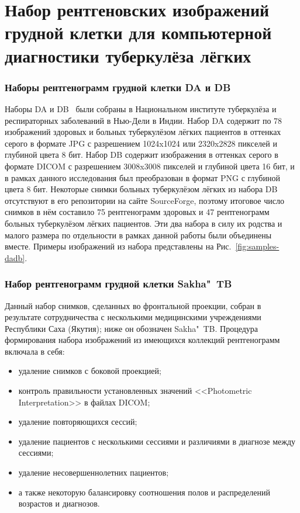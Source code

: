 \section{Набор рентгеновских изображений грудной клетки для компьютерной диагностики туберкулёза лёгких} \label{sec:sakha-tb}

\subsubsection{Наборы рентгенограмм грудной клетки DA и DB}

Наборы DA и DB~\cite{chauhan2014role} были собраны в Национальном институте туберкулёза и респираторных заболеваний в Нью-Дели в Индии. Набор DA содержит по 78 изображений здоровых и больных туберкулёзом лёгких пациентов в оттенках серого в формате JPG с разрешением 1024x1024 или 2320x2828 пикселей и глубиной цвета 8 бит. Набор DB содержит изображения в оттенках серого в формате DICOM с разрешением 3008x3008 пикселей и глубиной цвета 16 бит, и в рамках данного исследования был преобразован в формат PNG с глубиной цвета 8 бит. Некоторые снимки больных туберкулёзом лёгких из набора DB отсутствуют в его репозитории на сайте SourceForge, поэтому итоговое число снимков в нём составило 75 рентгенограмм здоровых и 47 рентгенограмм больных туберкулёзом лёгких пациентов. Эти два набора в силу их родства и малого размера по отдельности в рамках данной работы были объединены вместе. Примеры изображений из набора представлены на Рис.~\ref{fig:samples-dadb}.


\subsubsection{Набор рентгенограмм грудной клетки Sakha"~TB}

Данный набор снимков, сделанных во фронтальной проекции, собран в результате сотрудничества с несколькими медицинскими учреждениями Республики Саха (Якутия); ниже он обозначен Sakha"~TB. Процедура формирования набора изображений из имеющихся коллекций рентгенограмм включала в себя:

\begin{itemize}
	\item удаление снимков с боковой проекцией;
	\item контроль правильности установленных значений <<Photometric Interpretation>> в файлах DICOM;
	\item удаление повторяющихся сессий;
	\item удаление пациентов с несколькими сессиями и различиями в диагнозе между сессиями;
	\item удаление несовершеннолетних пациентов;
	\item а также некоторую балансировку соотношения полов и распределений возрастов и диагнозов.
\end{itemize}


